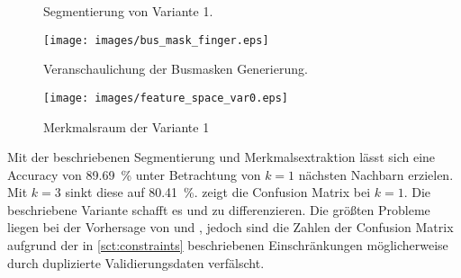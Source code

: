 \begin{figure}[ht]
    \caption{Segmentierung von Variante 1.\label{fig:segmentation_var0}}
\end{figure}

\begin{figure}[ht]
    \centering
    \texttt{[image: images/bus\_mask\_finger.eps]}
    \caption{Veranschaulichung der Busmasken Generierung.\label{fig:bus_mask_finger}}
\end{figure}

\begin{figure}[ht]
    \centering
    \texttt{[image: images/feature\_space\_var0.eps]}
    \caption{Merkmalsraum der Variante 1\label{fig:feature_space_var0}}
\end{figure}

Mit der beschriebenen Segmentierung und Merkmalsextraktion lässt sich eine \foreignlanguage{english}{Accuracy} von \SI{89.69}{\percent} unter Betrachtung von \(k = 1\) nächsten Nachbarn erzielen. Mit \(k = 3\) sinkt diese auf \SI{80.41}{\percent}.  zeigt die \foreignlanguage{english}{Confusion Matrix} bei \(k = 1\). Die beschriebene Variante schafft es  und  zu differenzieren. Die größten Probleme liegen bei der Vorhersage von  und , jedoch sind die Zahlen der \foreignlanguage{english}{Confusion Matrix} aufgrund der in \cref{sct:constraints} beschriebenen Einschränkungen möglicherweise durch duplizierte Validierungsdaten verfälscht.

